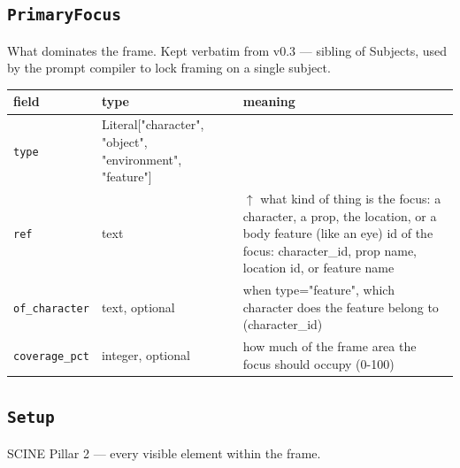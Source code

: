 \subsection*{\texttt{PrimaryFocus}}
\noindent What dominates the frame. Kept verbatim from v0.3 ---\allowbreak{} sibling of Subjects, used by the prompt compiler to lock framing on a single subject.

\begin{longtable}{@{}R{0.24\textwidth}R{0.21\textwidth}R{0.49\textwidth}@{}}
\toprule \textbf{field} & \textbf{type} & \textbf{meaning} \\ \midrule
\endhead
\texttt{type} & Literal["character", \allowbreak "object", \allowbreak "environment", \allowbreak "feature"] &  \\
\texttt{ref} & text & $\uparrow$ what kind of thing is the focus: a character, a prop, the location, or a body feature (like an eye) id of the focus: character\_\allowbreak id, prop name, location id, or feature name \\
\texttt{of\_\allowbreak character} & text, optional & when type="feature", which character does the feature belong to (character\_\allowbreak id) \\
\texttt{coverage\_\allowbreak pct} & integer, optional & how much of the frame area the focus should occupy (0-100) \\
\bottomrule
\end{longtable}

\subsection*{\texttt{Setup}}
\noindent SCINE Pillar 2 ---\allowbreak{} every visible element within the frame.


